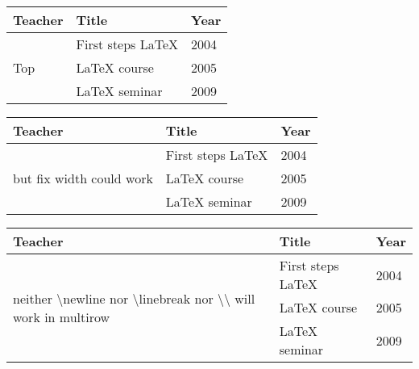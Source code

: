 \documentclass{article}
\begin{document}
\vspace{1,5cm}
\begin{tabular}{lll}
\toprule
Teacher & Title & Year \\
\midrule
\multirow[t]{3}{*}{Top} & First steps \LaTeX{} & 2004 \\ 
 & \LaTeX{} course & 2005 \\ 
 & \LaTeX{} seminar & 2009 \\ 
\bottomrule
\end{tabular}

\vspace{1,5cm}
\begin{tabular}{lll}
\toprule
Teacher & Title & Year \\
\midrule
\multirow{3}{3cm}{but fix width could work} & First
 steps \LaTeX{} & 2004 \\ 
 & \LaTeX{} course & 2005 \\ 
 & \LaTeX{} seminar & 2009 \\ 
\bottomrule
\end{tabular}


\vspace{1,5cm}
\begin{tabularx}{0.8\textwidth}{Xll}
\toprule
Teacher & Title & Year \\
\midrule
\multirow{3}{=}{ neither \textbackslash newline nor
 \textbackslash linebreak nor \textbackslash\textbackslash
will work in multirow} & First steps \LaTeX{} & 2004 \\ 
 & \LaTeX{} course & 2005 \\ 
 & \LaTeX{} seminar & 2009 \\ 
\bottomrule
\end{tabularx}
\end{document}
